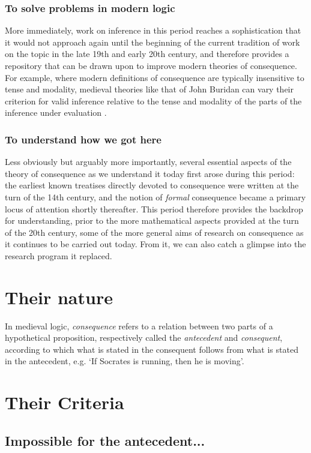 \documentclass[]{article}
\begin{document}
\subsubsection{To solve problems in modern logic}
More immediately, 
work on inference in this period reaches a sophistication that it would not approach again until the beginning of the current tradition of work on the topic in the late 19th and early 20th century, 
and therefore provides a repository that can be drawn upon to improve modern theories of consequence. 
For example, 
where modern definitions of consequence are typically insensitive to tense and modality, 
medieval theories like that of John Buridan can vary their criterion for valid inference relative to the tense and modality of the parts of the inference under evaluation \cite{Read2015}.

\subsubsection{To understand how we got here}
Less obviously but arguably more importantly, 
several essential aspects of the theory of consequence as we understand it today first arose during this period: 
the earliest known treatises directly devoted to consequence were written at the turn of the 14th century, 
and the notion of \emph{formal} consequence became a primary locus of attention shortly thereafter. 
This period therefore provides the backdrop for understanding, 
prior to the more mathematical aspects provided at the turn of the 20th century, 
some of the more general aims of research on consequence as it continues to be carried out today. 
From it, we can also catch a glimpse into the research program it replaced. 

\section{Their nature}
In medieval logic, 
\emph{consequence} refers to a relation between two parts of a hypothetical proposition, 
respectively called the \emph{antecedent} and \emph{consequent}, 
according to which what is stated in the consequent follows from what is stated in the antecedent, 
e.g. `If Socrates is running, then he is moving'. 

\section{Their Criteria}

\subsection{Impossible for the antecedent...}
\end{document}
